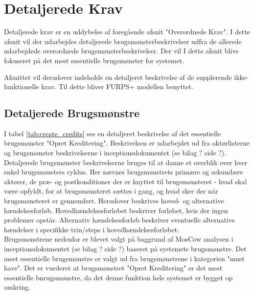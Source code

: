 \section{Detaljerede Krav}
\noindent
Detaljerede krav er en uddybelse af foregående afsnit "Overordnede Krav". I dette afsnit vil der udarbejdes detaljerede brugsmønsterbeskrivelser udfra de allerede udarbejdede overordnede brugsmønsterbeskrivelser. Der vil I dette afsnit blive fokuseret på det mest essentielle brugsmønster for systemet.

\noindent
Afsnittet vil derudover indeholde en detaljeret beskrivelse af de supplerende ikke-funktionelle krav. Til dette bliver FURPS+ modellen benyttet.


\subsection{Detaljerede Brugsmønstre}
I tabel \ref{tab:create_credits} ses en detaljeret beskrivelse af det essentielle brugsmønster "Opret Kreditering".
Beskrivelsen er udarbejdet ud fra aktørlisterne og brugsmønster beskrivelserne i inceptionsdokumentet (se bilag ? side ?). Detaljerede brugsmønster beskrivelserne bruges til at danne et overblik over hver enkel brugsmønsters cyklus. Her nævnes brugsmønstrets primære og sekundære aktører, de præ- og postkonditioner der er knyttet til brugsmønsteret - hvad skal være opfyldt, for at brugsmønsteret sættes i gang, og hvad sker der når brugsmønsteret er gennemført. Herudover beskrives hoved- og alternative hændelsesforløb. Hovedhændelsesforløbet beskriver forløbet, hvis der ingen problemer opstår. Alternativ hændelsesforløb beskriver eventuelle alternative hændelser i specifikke trin/steps i hovedhændelsesforløbet. \\

\noindent
Brugsmønstrene nedenfor er blevet valgt på baggrund af MosCow analysen i inceptionsdokumentet (se bilag ? side ?) baseret på systemets brugsmønstre. Det mest essentielle brugsmønstre er valgt ud fra brugsmønstrene i kategorien "must have". Det er vurderet at brugsmønstret "Opret Kreditering" er det mest essentielle bnrugsmønstre, da det denne funktion hele systemet er bygget op omkring.\\


